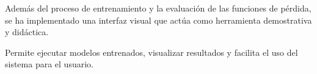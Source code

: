 Además del proceso de entrenamiento y la evaluación de las funciones de pérdida, se ha implementado una interfaz visual que actúa como herramienta demostrativa y didáctica. 

Permite ejecutar modelos entrenados, visualizar resultados y facilita el uso del sistema para el usuario.